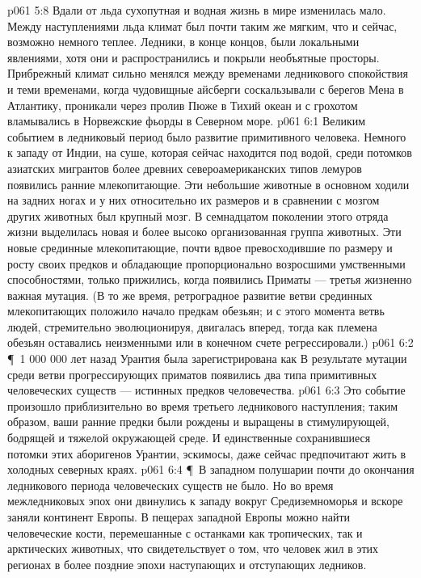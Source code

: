 \vs p061 5:8 Вдали от льда сухопутная и водная жизнь в мире изменилась мало. Между наступлениями льда климат был почти таким же мягким, что и сейчас, возможно немного теплее. Ледники, в конце концов, были локальными явлениями, хотя они и распространились и покрыли необъятные просторы. Прибрежный климат сильно менялся между временами ледникового спокойствия и теми временами, когда чудовищные айсберги соскальзывали с берегов Мена в Атлантику, проникали через пролив Пюже в Тихий океан и с грохотом вламывались в Норвежские фьорды в Северном море.
\vs p061 6:1 Великим событием в ледниковый период было развитие примитивного человека. Немного к западу от Индии, на суше, которая сейчас находится под водой, среди потомков азиатских мигрантов более древних североамериканских типов лемуров  появились ранние млекопитающие. Эти небольшие животные в основном ходили на задних ногах и у них относительно их размеров и в сравнении с мозгом других животных был крупный мозг. В семнадцатом поколении этого отряда жизни  выделилась новая и более высоко организованная группа животных. Эти новые срединные млекопитающие, почти вдвое превосходившие по размеру и росту своих предков и обладающие пропорционально возросшими умственными способностями, только прижились, когда  появились Приматы --- третья жизненно важная мутация. (В то же время, ретроградное развитие ветви срединных млекопитающих положило начало предкам обезьян; и с этого момента ветвь людей, стремительно эволюционируя, двигалась вперед, тогда как племена обезьян оставались неизменными или в конечном счете регрессировали.)
\vs p061 6:2 \P\ 1 000 000 лет назад Урантия была зарегистрирована как  В результате мутации среди ветви прогрессирующих приматов  появились два типа примитивных человеческих существ --- истинных предков человечества.
\vs p061 6:3 Это событие произошло приблизительно во время третьего ледникового наступления; таким образом, ваши ранние предки были рождены и выращены в стимулирующей, бодрящей и тяжелой окружающей среде. И единственные сохранившиеся потомки этих аборигенов Урантии, эскимосы, даже сейчас предпочитают жить в холодных северных краях.
\vs p061 6:4 \P\ В западном полушарии почти до окончания ледникового периода человеческих существ не было. Но во время межледниковых эпох они двинулись к западу вокруг Средиземноморья и вскоре заняли континент Европы. В пещерах западной Европы можно найти человеческие кости, перемешанные с останками как тропических, так и арктических животных, что свидетельствует о том, что человек жил в этих регионах в более поздние эпохи наступающих и отступающих ледников.
